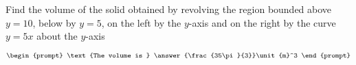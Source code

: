 \documentclass{ximera}
\author{Gregory Hartman \and Matthew Carr}
\begin{document}
\begin{exercise}






Find the volume of the solid obtained by revolving the region bounded above $y=10$, below by $y=5$, on the left by the $y$-axis and on the right by the curve $y=5x$ about the $y$-axis

\[
\begin{prompt}
\text{The volume is } \answer{\frac{35\pi}{3}}\unit{m}^3
\end{prompt}
\]




\end{exercise}
\end{document}
